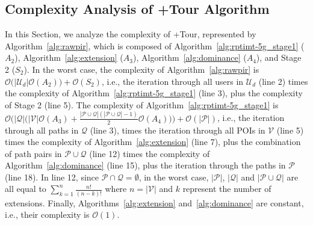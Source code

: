 \subsection{Complexity Analysis of +Tour Algorithm}
\label{sec:complexity-analysis}
In this Section, we analyze the complexity of +Tour, represented by Algorithm~\ref{alg:rawpir}, which is composed of Algorithm~\ref{alg:rptimt-5g_stage1} ($A_2$), Algorithm~\ref{alg:extension} ($A_3$), Algorithm~\ref{alg:dominance} ($A_4$), and Stage 2 ($S_2$). In the worst case, the complexity of Algorithm~\ref{alg:rawpir}  is $\mathcal{O}\big(|\mathcal{U}_d| \mathcal{O}(A_2)\big) + \mathcal{O}(S_2)$, i.e., the iteration through all users in $\mathcal{U}_d$ (line 2) times the complexity of Algorithm~\ref{alg:rptimt-5g_stage1} (line 3), plus the complexity of Stage 2 (line 5). The complexity of Algorithm~\ref{alg:rptimt-5g_stage1} is $\mathcal{O} \Big(|\mathcal{Q}| \big( |\mathcal{V}|\mathcal{O}(A_3) + \frac{|\mathcal{P} \cup \mathcal{Q}|  (|\mathcal{P} \cup \mathcal{Q}| - 1)}{2}\mathcal{O}(A_4)\big)\Big) + \mathcal{O}(|\mathcal{P}|)$, i.e., the iteration through all paths in $\mathcal{Q}$ (line 3), times the iteration through all POIs in $\mathcal{V}$ (line 5) times the complexity of Algorithm~\ref{alg:extension} (line 7), plus the combination of path pairs in $\mathcal{P} \cup \mathcal{Q}$ (line 12) times the complexity of Algorithm~\ref{alg:dominance} (line 15), plus the iteration through the paths in $\mathcal{P}$ (line 18). In line 12, since $\mathcal{P} \cap \mathcal{Q} = \emptyset$, in the worst case,  $|\mathcal{P}|$, $|\mathcal{Q}|$ and $|\mathcal{P} \cup \mathcal{Q}|$ are all equal to $\sum_{k=1}^n \frac{n!}{(n-k)!}$ where $n = |\mathcal{V}|$ and $k$ represent the number of extensions. Finally, Algorithms~\ref{alg:extension} and~\ref{alg:dominance} are constant, i.e., their complexity is $\mathcal{O}(1)$.